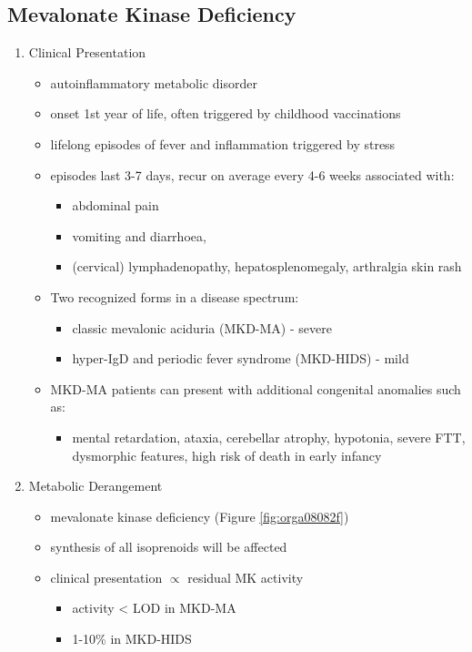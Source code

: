 \documentclass{scrartcl}
\begin{document}
\subsection{Mevalonate Kinase Deficiency}
\label{sec:orga59a1f8}
\begin{enumerate}
\item Clinical Presentation
\label{sec:org7a0544f}
\begin{itemize}
\item autoinflammatory metabolic disorder
\item onset 1st year of life, often triggered by childhood vaccinations
\item lifelong episodes of fever and inflammation triggered by stress
\item episodes last 3-7 days, recur on average every 4-6 weeks associated with:
\begin{itemize}
\item abdominal pain
\item vomiting and diarrhoea,
\item (cervical) lymphadenopathy, hepatosplenomegaly, arthralgia skin rash
\end{itemize}
\item Two recognized forms in a disease spectrum:
\begin{itemize}
\item classic mevalonic aciduria (MKD-MA) - severe
\item hyper-IgD and periodic fever syndrome (MKD-HIDS) - mild
\end{itemize}

\item MKD-MA patients can present with additional congenital anomalies
such as:
\begin{itemize}
\item mental retardation, ataxia, cerebellar atrophy, hypotonia, severe
FTT, dysmorphic features, high risk of death in early infancy
\end{itemize}
\end{itemize}

\item Metabolic Derangement
\label{sec:orgf22beeb}
\begin{itemize}
\item mevalonate kinase deficiency (Figure \ref{fig:orga08082f})
\end{itemize}
\begin{itemize}
\item synthesis of all isoprenoids will be affected
\item clinical presentation \(\propto\) residual MK activity
\begin{itemize}
\item activity < LOD in MKD-MA
\item 1-10\% in MKD-HIDS
\end{itemize}
\end{itemize}


\end{enumerate}
\end{document}
